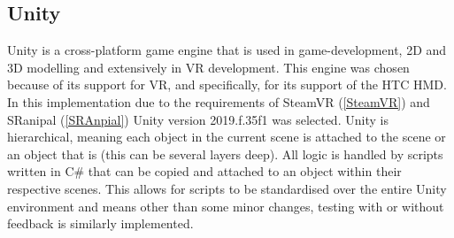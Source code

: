 \documentclass{l4proj}
\begin{document}
\subsection{Unity} \label{unity}
Unity is a cross-platform game engine that is used in game-development, 2D and 3D modelling and extensively in VR development. This engine was chosen because of its support for VR, and specifically, for its support of the HTC HMD. In this implementation due to the requirements of SteamVR (\ref{SteamVR}) and SRanipal (\ref{SRAnpial}) Unity version 2019.f.35f1 was selected. Unity is hierarchical, meaning each object in the current scene is attached to the scene or an object that is (this can be several layers deep). All logic is handled by scripts written in C\# that can be copied and attached to an object within their respective scenes. This allows for scripts to be standardised over the entire Unity environment and means other than some minor changes, testing with or without feedback is similarly implemented. 
\end{document}
